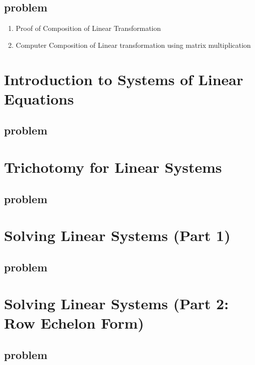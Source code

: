 \documentclass{article}
\begin{document}
\subsection{problem}
\begin{enumerate}
    \item Proof of Composition of Linear Transformation
    \item Computer Composition of Linear transformation using matrix
	multiplication
\end{enumerate}

\section{Introduction to Systems of Linear Equations}

\subsection{problem}
\begin{enumerate}
\end{enumerate}
\section{Trichotomy for Linear Systems}
\subsection{problem}
\begin{enumerate}
\end{enumerate}
\section{Solving Linear Systems (Part 1)}
\subsection{problem}
\begin{enumerate}
\end{enumerate}
\section{Solving Linear Systems (Part 2: Row Echelon Form)}
\subsection{problem}
\begin{enumerate}
\end{enumerate}
\end{document}
